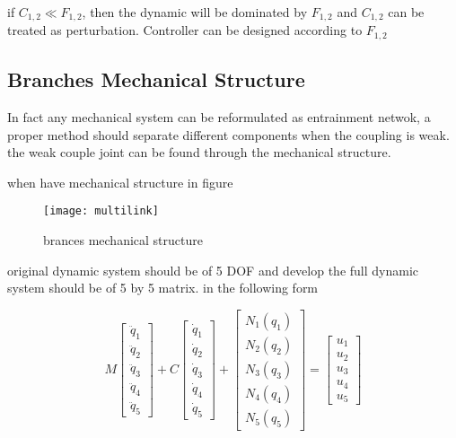 {if $C_{1,2} \ll F_{1,2}$, then the dynamic will be dominated by $F_{1,2}$ and $C_{1,2}$ can be treated as perturbation.
Controller can be designed according to $F_{1,2}$

\subsection*{Branches Mechanical Structure}
In fact any mechanical system can be reformulated as entrainment netwok,
a proper method should separate different components when the coupling is weak.
the weak couple joint can be found through the mechanical structure.

when have mechanical structure in figure
\begin{figure}[!htbp]
  \begin{center}
      \texttt{[image: multilink]}
    \caption{brances mechanical structure}
    \label{fig:branches structure}
\end{center}
\end{figure}

original dynamic system should be of 5 DOF and develop the full dynamic system should be of 5 by 5 matrix.
in the following form


\[
M\left[\begin{array}{c}
\ddot{q}_{1}\\
\ddot{q}_{2}\\
\ddot{q}_{3}\\
\ddot{q}_{4}\\
\ddot{q}_{5}\end{array}\right]+C\left[\begin{array}{c}
\dot{q}_{1}\\
\dot{q}_{2}\\
\dot{q}_{3}\\
\dot{q}_{4}\\
\dot{q}_{5}\end{array}\right]+\left[\begin{array}{c}
N_{1}(q_{1})\\
N_{2}(q_{2})\\
N_{3}(q_{3})\\
N_{4}(q_{4})\\
N_{5}(q_{5})\end{array}\right]=\left[\begin{array}{c}
u_{1}\\
u_{2}\\
u_{3}\\
u_{4}\\
u_{5}\end{array}\right]
\]

}
